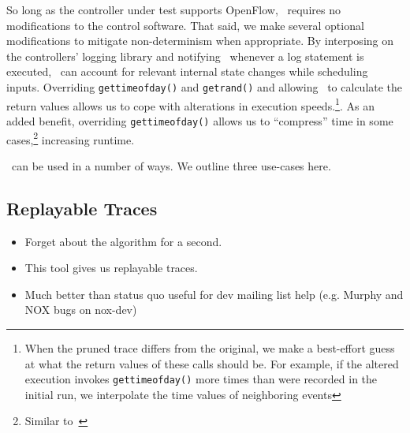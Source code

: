 So long as the controller under test supports OpenFlow, \projectname~requires
no modifications to the control software. That said, we make several optional
modifications to mitigate non-determinism when appropriate. By interposing on
the controllers' logging library and notifying \projectname~whenever a log statement is executed,
\projectname~can account for relevant internal state changes while scheduling inputs.
Overriding {\tt gettimeofday()} and {\tt getrand()} and allowing
\projectname~to calculate the return values allows us to cope with alterations in execution
speeds.\footnote{When the pruned trace differs from the original, we make a
best-effort guess at what the return values of these calls should be. For example,
if the altered execution invokes {\tt gettimeofday()} more times than were recorded
in the initial run, we interpolate the time values of neighboring events}.
As an added benefit, overriding {\tt gettimeofday()} allows us to ``compress''
time in some cases,\footnote{Similar to~\cite{Gupta06toinfinity}} increasing runtime.

\projectname~can be used in a number of ways. We outline three use-cases here.

\subsection{Replayable Traces}
\begin{itemize}
\item Forget about the algorithm for a second.
\item This tool gives us replayable traces.
\item Much better than status quo useful for dev mailing list help (e.g. Murphy and NOX bugs on nox-dev)
\end{itemize}

